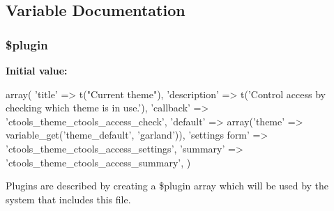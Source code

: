 \subsection{Variable Documentation}
\hypertarget{ctools_2plugins_2access_2theme_8inc_ada8a7130088351710bb02ed622d6bf65}{
\subsubsection[{\$plugin}]{\setlength{\rightskip}{0pt plus 5cm}\$plugin}}
\label{ctools_2plugins_2access_2theme_8inc_ada8a7130088351710bb02ed622d6bf65}
{\bfseries Initial value:}
\begin{DoxyCode}
 array(
  'title' => t("Current theme"),
  'description' => t('Control access by checking which theme is in use.'),
  'callback' => 'ctools_theme_ctools_access_check',
  'default' => array('theme' => variable_get('theme_default', 'garland')),
  'settings form' => 'ctools_theme_ctools_access_settings',
  'summary' => 'ctools_theme_ctools_access_summary',
)
\end{DoxyCode}
Plugins are described by creating a \$plugin array which will be used by the system that includes this file. 